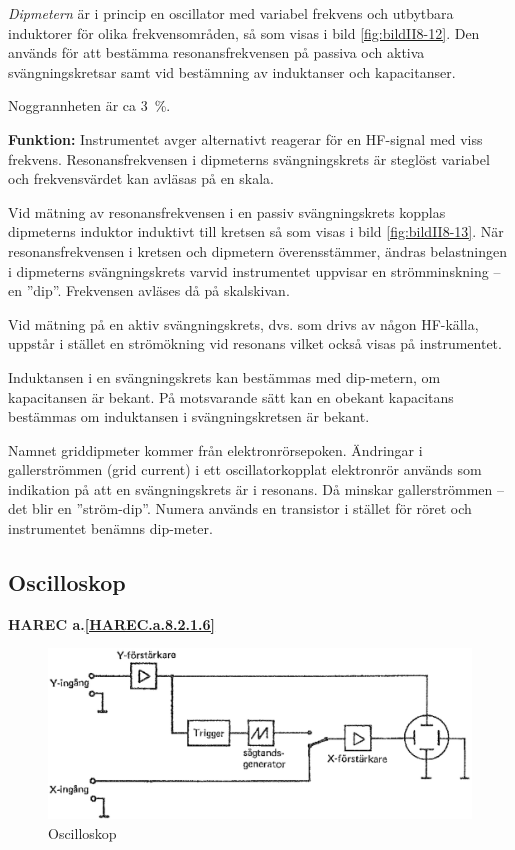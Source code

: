 \emph{Dipmetern} är i princip en oscillator med variabel frekvens och
utbytbara induktorer för olika frekvensområden, så som visas i bild
\ref{fig:bildII8-12}.
Den används för att bestämma resonansfrekvensen på passiva och aktiva
svängningskretsar samt vid bestämning av induktanser och kapacitanser.

Noggrannheten är ca 3~\%.

\textbf{Funktion:}
Instrumentet avger alternativt reagerar för en HF-signal med viss frekvens.
Resonansfrekvensen i dipmeterns svängningskrets är steglöst variabel och
frekvensvärdet kan avläsas på en skala.

Vid mätning av resonansfrekvensen i en passiv svängningskrets kopplas
dipmeterns induktor induktivt till kretsen så som visas i bild
\ref{fig:bildII8-13}.
När resonansfrekvensen i kretsen och dipmetern överensstämmer, ändras
belastningen i dipmeterns svängningskrets varvid instrumentet uppvisar en
strömminskning -- en ''dip''.
Frekvensen avläses då på skalskivan.

Vid mätning på en aktiv svängningskrets, dvs. som drivs av någon HF-källa,
uppstår i stället en strömökning vid resonans vilket också visas på
instrumentet.

Induktansen i en svängningskrets kan bestämmas med dip-metern, om kapacitansen
är bekant.
På motsvarande sätt kan en obekant kapacitans bestämmas om induktansen i
svängningskretsen är bekant.

Namnet griddipmeter kommer från elektronrörsepoken.
Ändringar i gallerströmmen (grid current) i ett oscillatorkopplat elektronrör
används som indikation på att en svängningskrets är i resonans.
Då minskar gallerströmmen -- det blir en ''ström-dip''.
Numera används en transistor i stället för röret och instrumentet benämns
dip-meter.

\subsection{Oscilloskop}
\textbf{
HAREC a.\ref{HAREC.a.8.2.1.6}\label{myHAREC.a.8.2.1.6}
}

\begin{figure}
  \includegraphics[width=\textwidth]{images/cropped_pdfs/bild_2_8-14.pdf}
  \caption{Oscilloskop}
  \label{fig:bildII8-14}
\end{figure}

